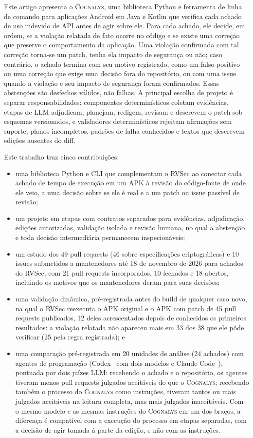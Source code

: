 \documentclass[conference]{IEEEtran}
\newcommand{\system}{\textsc{Cognalys}}
\begin{document}
Este artigo apresenta o \system, uma biblioteca Python e ferramenta de linha de comando para aplicações
Android em Java e Kotlin que verifica cada achado de uso indevido de API antes de
agir sobre ele. Para cada achado, ele decide, em ordem, se a
violação relatada de fato ocorre no código e se existe uma correção que preserve o
comportamento da aplicação. Uma violação confirmada com tal correção torna-se um patch,
tenha ela impacto de segurança ou não; caso contrário, o achado termina com seu
motivo registrado, como um falso positivo ou uma correção que exige uma decisão
fora do repositório, ou com uma issue quando a violação e seu impacto de
segurança foram confirmados. Essas abstenções são desfechos válidos, não falhas.
A principal escolha de projeto é separar responsabilidades: componentes
determinísticos coletam evidências, etapas de LLM adjudicam, planejam, redigem,
revisam e descrevem o patch sob esquemas versionados, e validadores
determinísticos rejeitam afirmações sem suporte, planos incompletos, padrões de
falha conhecidos e textos que descrevem edições ausentes do diff.

Este trabalho traz cinco contribuições:
\begin{itemize}
  \item uma biblioteca Python e CLI que complementam o RVSec ao conectar cada
  achado de tempo de execução em um APK à revisão do código-fonte de onde ele veio, a uma decisão
  sobre se ele é real e a um patch ou issue passível de revisão;
  \item um projeto em etapas com contratos separados para evidências, adjudicação,
  edições autorizadas, validação isolada e revisão humana, no qual a abstenção
  e toda decisão intermediária permanecem inspecionáveis;
  \item um estudo dos 49 pull requests (46 sobre especificações criptográficas)
  e 10 issues submetidos a mantenedores até 18 de novembro de 2026 para achados
  do RVSec, com 21 pull requests incorporados, 10 fechados e 18 abertos,
  incluindo os motivos que os mantenedores deram para suas decisões;
  \item uma validação dinâmica, pré-registrada antes do build de qualquer caso novo, na
  qual o RVSec reexecuta o APK original e o APK com patch de 45 pull requests
  publicados, 12 deles acrescentados depois de conhecidos os primeiros resultados: a violação relatada não apareceu mais em 33 dos 38 que ele
  pôde verificar (25 pela regra registrada); e
  \item uma comparação pré-registrada em 20 unidades de análise (24 achados) com
  agentes de programação (Codex~\cite{openai2026codex} com dois modelos e Claude Code~\cite{anthropic2026claudecode}), pontuada por dois
  juízes LLM: recebendo o achado e o repositório, os agentes tiveram menos pull
  requests julgados aceitáveis do que o \system{}; recebendo também o processo do
  \system{} como instruções, tiveram tantos ou mais julgados aceitáveis na leitura
  completa, mas mais julgados inaceitáveis. Com o mesmo modelo e as mesmas
  instruções do \system{} em um dos braços, a diferença é compatível com a
  execução do processo em etapas separadas, com a decisão de agir tomada à parte
  da edição, e não com as instruções.
\end{itemize}
\end{document}
